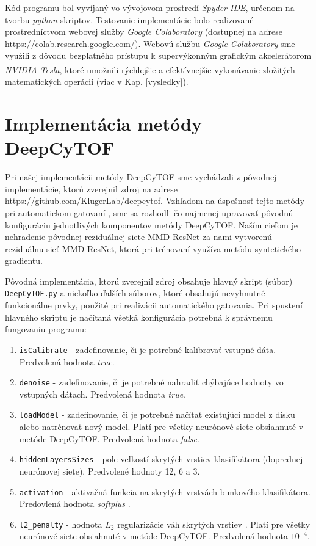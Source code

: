 Kód programu bol vyvíjaný vo vývojovom prostredí \textit{Spyder IDE}, určenom na tvorbu \textit{python} skriptov. Testovanie implementácie bolo realizované prostredníctvom webovej služby \textit{Google Colaboratory} (dostupnej na adrese \url{https://colab.research.google.com/}). Webovú službu \textit{Google Colaboratory} sme využili z dôvodu bezplatného prístupu k supervýkonným grafickým akcelerátorom \textit{NVIDIA\textsuperscript{\textregistered} Tesla}, ktoré umožnili rýchlejšie a efektívnejšie vykonávanie zložitých matematických operácií (viac v Kap. \ref{vysledky}). 

\section{Implementácia metódy DeepCyTOF}
\label{impl_deepcytof}

Pri našej implementácii metódy DeepCyTOF sme vychádzali z pôvodnej implementácie, ktorú zverejnil zdroj \cite{Li2017} na adrese \url{https://github.com/KlugerLab/deepcytof}. Vzhľadom na úspešnosť tejto metódy pri automatickom gatovaní \cite{Li2016, Li2017}, sme sa rozhodli čo najmenej upravovať pôvodnú konfiguráciu jednotlivých komponentov metódy DeepCyTOF. Naším cieľom je nehradenie pôvodnej reziduálnej siete MMD-ResNet za nami vytvorenú reziduálnu sieť MMD-ResNet, ktorá pri trénovaní využíva metódu syntetického gradientu.

\begin{sloppypar}
Pôvodná implementácia, ktorú zverejnil zdroj \cite{Li2017} obsahuje hlavný skript (súbor) \texttt{DeepCyTOF.py} a niekoľko ďalších súborov, ktoré obsahujú nevyhnutné funkcionálne prvky, použité pri realizácii automatického gatovania. Pri spustení hlavného skriptu je načítaná všetká konfigurácia potrebná k správnemu fungovaniu programu:
\end{sloppypar}
\begin{enumerate}
    \item \texttt{isCalibrate} - zadefinovanie, či je potrebné kalibrovať vstupné dáta. Predvolená hodnota \textit{true}.
    \item \texttt{denoise} - zadefinovanie, či je potrebné nahradiť chýbajúce hodnoty vo vstupných dátach. Predvolená hodnota \textit{true}.
    \item \texttt{loadModel} - zadefinovanie, či je potrebné načítať existujúci model z disku alebo natrénovať nový model. Platí pre všetky neurónové siete obsiahnuté v metóde DeepCyTOF. Predvolená hodnota \textit{false}.
    \item \texttt{hiddenLayersSizes} - pole veľkostí skrytých vrstiev klasifikátora (doprednej neurónovej siete). Predvolené hodnoty 12, 6 a 3.
    \item \texttt{activation} - aktivačná funkcia na skrytých vrstvách bunkového klasifikátora. Predovlená hodnota \textit{softplus} \cite{Goh1995}.
    \item \texttt{l2_penalty} - hodnota \textit{$L_2$} regularizácie váh skrytých vrstiev \cite{Goh1995}. Platí pre všetky neurónové siete obsiahnuté v metóde DeepCyTOF. Predvolená hodnota $10^{-4}$.
\end{enumerate}

